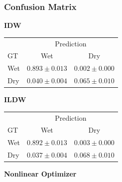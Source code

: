 \documentclass[11pt]{article}
\begin{document}
\subsubsection{Confusion Matrix}
\begin{table}[H]
  \centering
  \begin{minipage}[t]{0.31\textwidth}
    \centering
    \textbf{IDW}

    \vspace{0.35em}
    \scriptsize
    \begin{tabular}{lcc}
      \toprule
       & \multicolumn{2}{c}{Prediction} \\
      GT & Wet & Dry \\
      \midrule
      Wet & $0.893 \pm 0.013$ & $0.002 \pm 0.000$ \\
      Dry & $0.040 \pm 0.004$ & $0.065 \pm 0.010$ \\
      \bottomrule
    \end{tabular}
  \end{minipage}
  \hfill
  \begin{minipage}[t]{0.31\textwidth}
    \centering
    \textbf{ILDW}

    \vspace{0.35em}
    \scriptsize
    \begin{tabular}{lcc}
      \toprule
       & \multicolumn{2}{c}{Prediction} \\
      GT & Wet & Dry \\
      \midrule
      Wet & $0.892 \pm 0.013$ & $0.003 \pm 0.000$ \\
      Dry & $0.037 \pm 0.004$ & $0.068 \pm 0.010$ \\
      \bottomrule
    \end{tabular}
  \end{minipage}
  \hfill
  \begin{minipage}[t]{0.31\textwidth}
    \centering
    \textbf{Nonlinear Optimizer}


\end{minipage}
\end{table}
\end{document}
